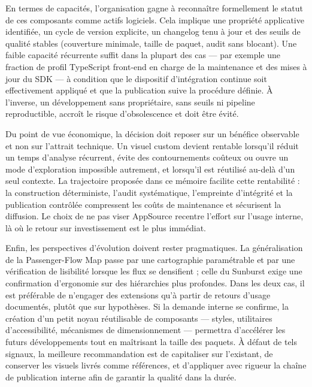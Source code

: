En termes de capacités, l’organisation gagne à reconnaître formellement le statut de ces composants comme actifs logiciels. Cela implique une propriété applicative identifiée, un cycle de version explicite, un changelog tenu à jour et des seuils de qualité stables (couverture minimale, taille de paquet, audit sans blocant). Une faible capacité récurrente suffit dans la plupart des cas — par exemple une fraction de profil TypeScript front-end en charge de la maintenance et des mises à jour du SDK — à condition que le dispositif d’intégration continue soit effectivement appliqué et que la publication suive la procédure définie. À l’inverse, un développement sans propriétaire, sans seuils ni pipeline reproductible, accroît le risque d’obsolescence et doit être évité.

Du point de vue économique, la décision doit reposer sur un bénéfice observable et non sur l’attrait technique. Un visuel custom devient rentable lorsqu’il réduit un temps d’analyse récurrent, évite des contournements coûteux ou ouvre un mode d’exploration impossible autrement, et lorsqu’il est réutilisé au-delà d’un seul contexte. La trajectoire proposée dans ce mémoire facilite cette rentabilité : la construction déterministe, l’audit systématique, l’empreinte d’intégrité et la publication contrôlée compressent les coûts de maintenance et sécurisent la diffusion. Le choix de ne pas viser AppSource recentre l’effort sur l’usage interne, là où le retour sur investissement est le plus immédiat.

Enfin, les perspectives d’évolution doivent rester pragmatiques. La généralisation de la Passenger-Flow Map passe par une cartographie paramétrable et par une vérification de lisibilité lorsque les flux se densifient ; celle du Sunburst exige une confirmation d’ergonomie sur des hiérarchies plus profondes. Dans les deux cas, il est préférable de n’engager des extensions qu’à partir de retours d’usage documentés, plutôt que sur hypothèses. Si la demande interne se confirme, la création d’un petit noyau réutilisable de composants — styles, utilitaires d’accessibilité, mécanismes de dimensionnement — permettra d’accélérer les futurs développements tout en maîtrisant la taille des paquets. À défaut de tels signaux, la meilleure recommandation est de capitaliser sur l’existant, de conserver les visuels livrés comme références, et d’appliquer avec rigueur la chaîne de publication interne afin de garantir la qualité dans la durée.
